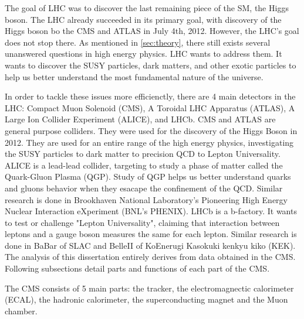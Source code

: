 The goal of LHC was to discover the last remaining piece of the SM, the Higgs boson.
The LHC already succeeded in its primary goal, with discovery of the Higgs boson bo the CMS and ATLAS in July 4th, 2012.
However, the LHC's goal does not stop there. 
As mentioned in \ref{sec:theory}, there still exists several unanswered questions in high energy physics.
LHC wants to address them. It wants to discover the SUSY particles, dark matters, and other exotic particles to help us better understand the most fundamental nature of the universe.

In order to tackle these issues more efficienctly, there are 4 main detectors in the LHC: Compact Muon Solenoid (CMS), A Toroidal LHC Apparatus (ATLAS), A Large Ion Collider Experiment (ALICE), and LHCb.
CMS and ATLAS are general purpose colliders. They were used for the discovery of the Higgs Boson in 2012. They are used for an entire range of the high energy physics, investigating the SUSY particles to dark matter to precision QCD to Lepton Universality.
ALICE is a lead-lead collider, targeting to study a phase of matter called the Quark-Gluon Plasma (QGP). Study of QGP helps us better understand quarks and gluons behavior when they esacape the confinement of the QCD.
Similar research is done in Brookhaven National Laboratory's Pioneering High Energy Nuclear Interaction eXperiment (BNL's PHENIX).
LHCb is a b-factory. It wants to test or challenge "Lepton Universality", claiming that interaction between leptons and a gauge boson measures the same for each lepton. 
Similar research is done in BaBar of SLAC and BelleII of KoEnerugi Kasokuki kenkyu kiko (KEK).
The analysis of this dissertation entirely derives from data obtained in the CMS.
Following subsections detail parts and functions of each part of the CMS.

The CMS consists of 5 main parts: the tracker, the electromagnectic calorimeter (ECAL), the hadronic calorimeter, the superconducting magnet and the Muon chamber.

